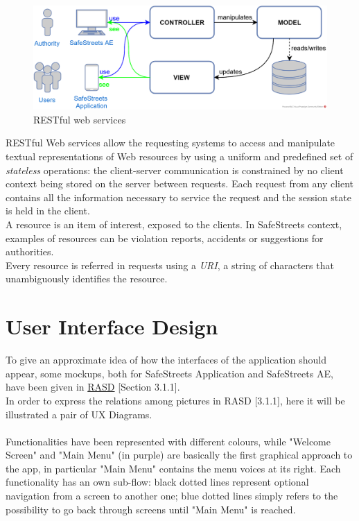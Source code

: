 \documentclass{article}
\begin{document}
				\begin{figure}[H]
					\centering
					\includegraphics[width=1\textwidth]{diagrams/REST.png}
					\caption[RESTful web services]{RESTful web services}
					\label{fig:RESTful web services}
				\end{figure}

				RESTful Web services allow the requesting systems to access and manipulate textual representations of Web resources by using a uniform and predefined set of \textit{stateless} operations: the client-server communication is constrained by no client context being stored on the server between requests. Each request from any client contains all the information necessary to service the request and the session state is held in the client.\\
				
				A resource is an item of interest, exposed to the clients. In SafeStreets context, examples of resources can be violation reports, accidents or suggestions for authorities.\\
				Every resource is referred in requests using a \textit{URI}, a string of characters that unambiguously identifies the resource.
		
	\clearpage	
	\section{User Interface Design}
		To give an approximate idea of how the interfaces of the application should appear, some mockups, both for SafeStreets Application and SafeStreets AE, have been given in \href{run:d:../DeliveryFolder/RASD1.pdf}{RASD} [Section 3.1.1].\\ 
		In order to express the relations among pictures in RASD [3.1.1], here it will be illustrated a pair of UX Diagrams.\\
		\\
		Functionalities have been represented with different colours, while "Welcome Screen" and "Main Menu" (in purple) are basically the first graphical approach to the app, in particular "Main Menu" contains the menu voices at its right.
		Each functionality has an own sub-flow: black dotted lines represent optional navigation from a screen to another one; blue dotted lines simply refers to the possibility to go back through screens until "Main Menu" is reached.
		
\end{document}
